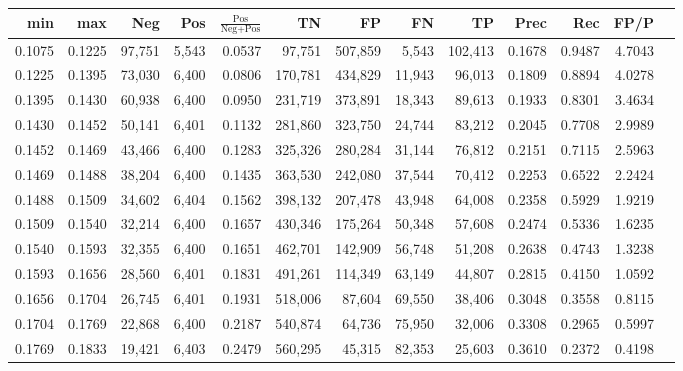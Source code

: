 \begin{tabular}{rrrrrrrrrrrrr}
\toprule
   min &    max &    Neg &   Pos & $\frac{\text{Pos}}{\text{Neg}+\text{Pos}}$ &      TN &      FP &      FN &      TP &   Prec &    Rec &   FP/P \\
\midrule
0.1075 & 0.1225 & 97,751 & 5,543 &                                     0.0537 &  97,751 & 507,859 &   5,543 & 102,413 & 0.1678 & 0.9487 & 4.7043 \\
0.1225 & 0.1395 & 73,030 & 6,400 &                                     0.0806 & 170,781 & 434,829 &  11,943 &  96,013 & 0.1809 & 0.8894 & 4.0278 \\
0.1395 & 0.1430 & 60,938 & 6,400 &                                     0.0950 & 231,719 & 373,891 &  18,343 &  89,613 & 0.1933 & 0.8301 & 3.4634 \\
0.1430 & 0.1452 & 50,141 & 6,401 &                                     0.1132 & 281,860 & 323,750 &  24,744 &  83,212 & 0.2045 & 0.7708 & 2.9989 \\
0.1452 & 0.1469 & 43,466 & 6,400 &                                     0.1283 & 325,326 & 280,284 &  31,144 &  76,812 & 0.2151 & 0.7115 & 2.5963 \\
0.1469 & 0.1488 & 38,204 & 6,400 &                                     0.1435 & 363,530 & 242,080 &  37,544 &  70,412 & 0.2253 & 0.6522 & 2.2424 \\
0.1488 & 0.1509 & 34,602 & 6,404 &                                     0.1562 & 398,132 & 207,478 &  43,948 &  64,008 & 0.2358 & 0.5929 & 1.9219 \\
0.1509 & 0.1540 & 32,214 & 6,400 &                                     0.1657 & 430,346 & 175,264 &  50,348 &  57,608 & 0.2474 & 0.5336 & 1.6235 \\
0.1540 & 0.1593 & 32,355 & 6,400 &                                     0.1651 & 462,701 & 142,909 &  56,748 &  51,208 & 0.2638 & 0.4743 & 1.3238 \\
0.1593 & 0.1656 & 28,560 & 6,401 &                                     0.1831 & 491,261 & 114,349 &  63,149 &  44,807 & 0.2815 & 0.4150 & 1.0592 \\
0.1656 & 0.1704 & 26,745 & 6,401 &                                     0.1931 & 518,006 &  87,604 &  69,550 &  38,406 & 0.3048 & 0.3558 & 0.8115 \\
0.1704 & 0.1769 & 22,868 & 6,400 &                                     0.2187 & 540,874 &  64,736 &  75,950 &  32,006 & 0.3308 & 0.2965 & 0.5997 \\
0.1769 & 0.1833 & 19,421 & 6,403 &                                     0.2479 & 560,295 &  45,315 &  82,353 &  25,603 & 0.3610 & 0.2372 & 0.4198 \\

\end{tabular}
